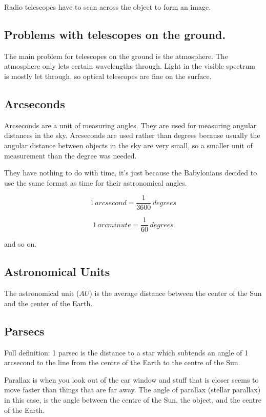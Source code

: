 \documentclass[a4paper, 12pt]{article}
\begin{document}
Radio telescopes have to scan across the object to form an image.

\subsection{Problems with telescopes on the ground.}

The main problem for telescopes on the ground is the atmosphere. The atmosphere only lets certain wavelengths through. Light in the visible spectrum is mostly let through, so optical telescopes are fine on the surface.

\subsection {Arcseconds}

Arcseconds are a unit of measuring angles. They are used for measuring angular distances in the sky. Arcseconds are used rather than degrees because usually the angular distance between objects in the sky are very small, so a smaller unit of measurement than the degree was needed.

They have nothing to do with time, it's just because the Babylonians decided to use the same format as time for their astronomical angles.

$$
1 \, arcsecond = \frac{1}{3600} \, degrees
$$

$$
1 \, arcminute = \frac{1}{60} \, degrees
$$

and so on.

\subsection{Astronomical Units}

The astronomical unit ($AU$) is the average distance between the center of the Sun and the center of the Earth.

\subsection{Parsecs}

Full definition: 1 parsec is the distance to a star which subtends an angle of 1 arcsecond to the line from the centre of the Earth to the centre of the Sun.

Parallax is when you look out of the car window and stuff that is closer seems to move faster than things that are far away. The angle of parallax (stellar parallax) in this case, is the angle between the centre of the Sun, the object, and the centre of the Earth.
\end{document}
